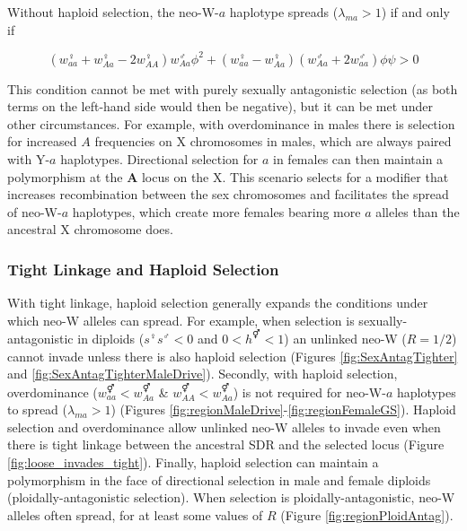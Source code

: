 \documentclass[12pt]{article}
\begin{document}
Without haploid selection, the neo-W-$a$ haplotype spreads ($\lambda_{ma}>1$) if and only if

\begin{equation}\label{eq:BeqWaspread}
(w_{aa}^\female + w_{Aa}^\female-2w_{AA}^\female)w_{Aa}^\male \phi^2 + (w_{aa}^\female-w_{Aa}^\female)(w_{Aa}^\male+2w_{aa}^\male) \phi \psi >0
\end{equation}

\noindent
This condition cannot be met with purely sexually antagonistic selection (as both terms on the left-hand side would then be negative), but it can be met under other circumstances. 
For example, with overdominance in males there is selection for increased $A$ frequencies on X chromosomes in males, which are always paired with Y-$a$ haplotypes.
Directional selection for $a$ in females can then maintain a polymorphism at the $\textbf{A}$ locus on the X.
This scenario selects for a modifier that increases recombination between the sex chromosomes \citep[e.g., blue region of Figure 2d in][]{Otto2014} and facilitates the spread of neo-W-$a$ haplotypes, which create more females bearing more $a$ alleles than the ancestral X chromosome does. 

\subsubsection*{Tight Linkage and Haploid Selection}

With tight linkage, haploid selection generally expands the conditions under which neo-W alleles can spread. 
For example, when selection is sexually-antagonistic in diploids ($s^\female s^\male <0$ and $0<h^\Hermaphrodite<1$) an unlinked neo-W ($R=1/2$) cannot invade unless there is also haploid selection (Figures \ref{fig:SexAntagTighter} and \ref{fig:SexAntagTighterMaleDrive}). 
Secondly, with haploid selection, overdominance ($w_{aa}^\Hermaphrodite<w_{Aa}^\Hermaphrodite$ \& $w_{AA}^\Hermaphrodite<w_{Aa}^\Hermaphrodite$) is not required for neo-W-$a$ haplotypes to spread ($\lambda_{ma}>1$) (Figures \ref{fig:regionMaleDrive}-\ref{fig:regionFemaleGS}). 
Haploid selection and overdominance allow unlinked neo-W alleles to invade even when there is tight linkage between the ancestral SDR and the selected locus (Figure \ref{fig:loose_invades_tight}).
Finally, haploid selection can maintain a polymorphism in the face of directional selection in male and female diploids (ploidally-antagonistic selection). 
When selection is ploidally-antagonistic, neo-W alleles often spread, for at least some values of $R$ (Figure \ref{fig:regionPloidAntag}). 
\end{document}
